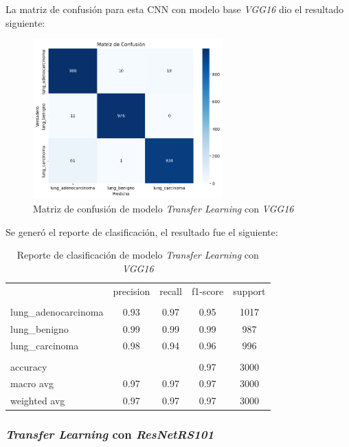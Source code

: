 La matriz de confusión para esta CNN con modelo base \textit{VGG16} dio el resultado siguiente:

\begin{figure}[H]
    \centering
    \includegraphics[width=0.65\textwidth]{Francisco/Imagenes resultados/CMCNN2.png} 
    \caption{Matriz de confusión de modelo \textit{Transfer Learning} con \textit{VGG16}}
\end{figure}

Se generó el reporte de clasificación, el resultado fue el siguiente:

\begin{table}[H]
    \centering
    \begin{tabular}{l c c c c}

         & precision & recall & f1-score & support \\
        \\
        lung\_adenocarcinoma & 0.93 & 0.97 & 0.95 & 1017 \\
        lung\_benigno & 0.99 & 0.99 & 0.99 & 987 \\
        lung\_carcinoma & 0.98 & 0.94 & 0.96 & 996 \\
        \\
        accuracy &  &  & 0.97 & 3000 \\
        macro avg & 0.97 & 0.97 & 0.97 & 3000 \\
        weighted avg & 0.97 & 0.97 & 0.97 & 3000
    
    \end{tabular}
    \caption{Reporte de clasificación de modelo \textit{Transfer Learning} con \textit{VGG16}}
\end{table}

\subsubsection{\textit{Transfer Learning} con \textit{ResNetRS101}}

